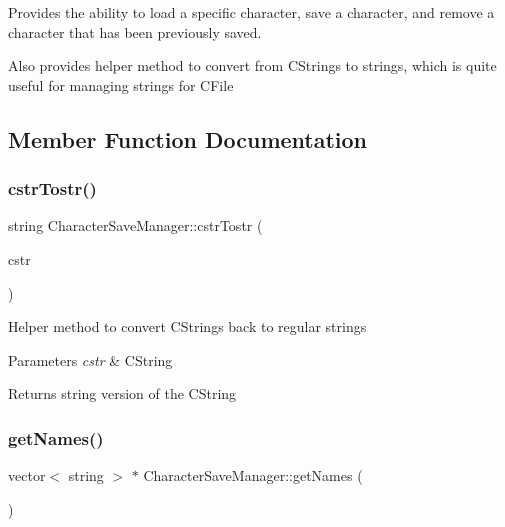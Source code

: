 Provides the ability to load a specific character, save a character, and remove a character that has been previously saved. 

Also provides helper method to convert from C\+Strings to strings, which is quite useful for managing strings for C\+File 

\subsection{Member Function Documentation}
\hypertarget{class_character_save_manager_ad9adf9eda9b89e67a977167c954a8d7c}{}\label{class_character_save_manager_ad9adf9eda9b89e67a977167c954a8d7c} 
\subsubsection{\texorpdfstring{cstr\+Tostr()}{cstrTostr()}}
{\footnotesize\ttfamily string Character\+Save\+Manager\+::cstr\+Tostr (\begin{DoxyParamCaption}\item[{C\+String \&}]{cstr }\end{DoxyParamCaption})\hspace{0.3cm}{\ttfamily [static]}}

Helper method to convert C\+Strings back to regular strings 
\begin{DoxyParams}{Parameters}
{\em cstr} & C\+String \\
\hline
\end{DoxyParams}
\begin{DoxyReturn}{Returns}
string version of the C\+String 
\end{DoxyReturn}
\hypertarget{class_character_save_manager_a56637487c732f1813992d3d6b558c817}{}\label{class_character_save_manager_a56637487c732f1813992d3d6b558c817} 
\subsubsection{\texorpdfstring{get\+Names()}{getNames()}}
{\footnotesize\ttfamily vector$<$ string $>$ $\ast$ Character\+Save\+Manager\+::get\+Names (\begin{DoxyParamCaption}{ }\end{DoxyParamCaption})\hspace{0.3cm}{\ttfamily [static]}}


